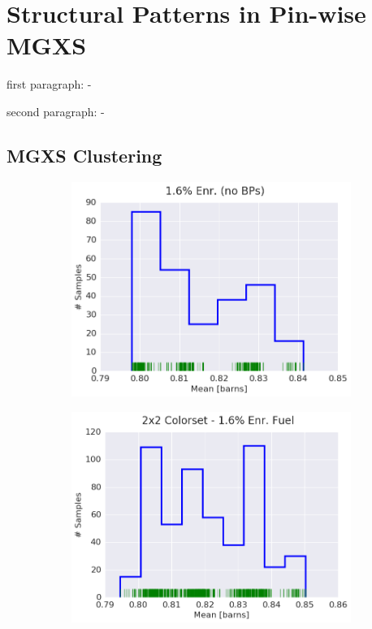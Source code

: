\chapter{Structural Patterns in Pin-wise MGXS}
\label{chap:spatial}

first paragraph: 
-

second paragraph:
-

\section{MGXS Clustering}


\begin{figure}[h!]
\centering
\begin{subfigure}{0.5\textwidth}
  \centering
  \includegraphics[width=\linewidth]{figures/patterns/assm-1.6/hist-kde-rug/assm-16-capt-1}
  \caption{}
  \label{fig:chap9-hist-assm-1.6-capt}
\end{subfigure}%
\begin{subfigure}{0.5\textwidth}
  \centering
  \includegraphics[width=\linewidth]{figures/patterns/2x2/hist-kde-rug/16-enr-capt-1}

\end{subfigure}
\end{figure}
